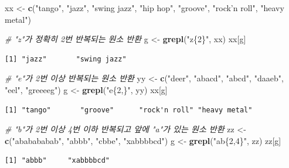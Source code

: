 \documentclass[
  11pt,
]{krantz}
\newenvironment{Shaded}{\begin{snugshade}}{\end{snugshade}}
\newcommand{\CommentTok}[1]{\textcolor[rgb]{0.37,0.37,0.37}{\textit{#1}}}
\newcommand{\KeywordTok}[1]{\textcolor[rgb]{0.27,0.27,0.27}{\textbf{#1}}}
\newcommand{\NormalTok}[1]{#1}
\newcommand{\StringTok}[1]{\textcolor[rgb]{0.5,0.5,0.5}{#1}}
\begin{document}
\footnotesize

\begin{Shaded}
\begin{Highlighting}[]
\NormalTok{xx <-}\StringTok{ }\KeywordTok{c}\NormalTok{(}\StringTok{"tango"}\NormalTok{, }\StringTok{"jazz"}\NormalTok{, }\StringTok{"swing jazz"}\NormalTok{, }\StringTok{"hip hop"}\NormalTok{, }
        \StringTok{"groove"}\NormalTok{, }\StringTok{"rock'n roll"}\NormalTok{, }\StringTok{"heavy metal"}\NormalTok{)}

\CommentTok{# "z"가 정확히 2번 반복되는 원소 반환}
\NormalTok{g <-}\StringTok{ }\KeywordTok{grepl}\NormalTok{(}\StringTok{"z\{2\}"}\NormalTok{, xx)}
\NormalTok{xx[g]}
\end{Highlighting}
\end{Shaded}

\begin{verbatim}
[1] "jazz"       "swing jazz"
\end{verbatim}

\begin{Shaded}
\begin{Highlighting}[]
\CommentTok{# "e"가 2번 이상 반복되는 원소 반환}
\NormalTok{yy <-}\StringTok{ }\KeywordTok{c}\NormalTok{(}\StringTok{"deer"}\NormalTok{, }\StringTok{"abacd"}\NormalTok{, }\StringTok{"abcd"}\NormalTok{, }\StringTok{"daaeb"}\NormalTok{, }\StringTok{"eel"}\NormalTok{, }\StringTok{"greeeeg"}\NormalTok{)}
\NormalTok{g <-}\StringTok{ }\KeywordTok{grepl}\NormalTok{(}\StringTok{"e\{2,\}"}\NormalTok{, yy)}
\NormalTok{xx[g]}
\end{Highlighting}
\end{Shaded}

\begin{verbatim}
[1] "tango"       "groove"      "rock'n roll" "heavy metal"
\end{verbatim}

\begin{Shaded}
\begin{Highlighting}[]
\CommentTok{# "b"가 2번 이상 4번 이하 반복되고 앞에 "a"가 있는 원소 반환}
\NormalTok{zz <-}\StringTok{ }\KeywordTok{c}\NormalTok{(}\StringTok{"ababababab"}\NormalTok{, }\StringTok{"abbb"}\NormalTok{, }\StringTok{"cbbe"}\NormalTok{, }\StringTok{"xabbbbcd"}\NormalTok{)}
\NormalTok{g <-}\StringTok{ }\KeywordTok{grepl}\NormalTok{(}\StringTok{"ab\{2,4\}"}\NormalTok{, zz)}
\NormalTok{zz[g]}
\end{Highlighting}
\end{Shaded}

\begin{verbatim}
[1] "abbb"     "xabbbbcd"
\end{verbatim}
\end{document}
